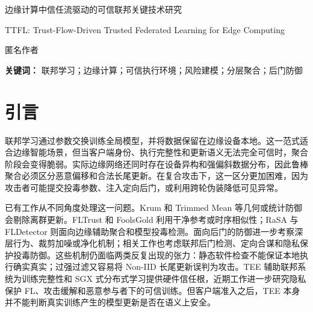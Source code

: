 \documentclass[10pt,a4paper,UTF8,fontset=fandol]{ctexart}
\begin{document}
\begin{center}
    {\Large 边缘计算中信任流驱动的可信联邦关键技术研究\par}
    \vspace{4pt}
    {\large TTFL: Trust-Flow-Driven Trusted Federated Learning for Edge Computing\par}
    \vspace{8pt}
    {匿名作者\par}
\end{center}

\begin{abstract}
    联邦学习（FL）通过避免原始数据迁移来支持边缘智能协同训练，但开放式边缘参与也使聚合过程暴露于不可信执行、模型投毒、隐蔽后门以及严重 Non-IID 偏移等风险之下。现有鲁棒聚合方法往往依赖更严格的阈值来拒绝恶意更新，却容易同时剔除合法的长尾客户端。本文提出一种信任流驱动的可信联邦学习框架，将硬件锚定准入、运行时信任证据、双流信誉演化和风险门控分层聚合联系起来。该方法通过历史性能流和瞬时风险流分离长期效用与短期攻击风险，再利用按层门控、裁剪和幸存者权重重归一化，在抑制投毒更新的同时保留有价值的异构贡献。基于 Flower/PyTorch 的 CIFAR-10 实验包含 20 个准入客户端、6 类混合攻击和 5 次重复运行；结果表明，在 30\% 恶意设置下，该方法达到 92.31\% 的准确率和 10.21\% 的 ASR，永久封禁误杀率接近零。
\end{abstract}

\noindent\textbf{关键词：} 联邦学习；边缘计算；可信执行环境；风险建模；分层聚合；后门防御

\section{引言}

联邦学习通过参数交换训练全局模型，并将数据保留在边缘设备本地\cite{kairouz2021flsurvey,mcmahan2017fedavg}。这一范式适合边缘智能场景，但当客户端身份、执行完整性和更新语义无法完全可信时，聚合阶段会变得脆弱。实际边缘网络还同时存在设备异构和强偏斜数据分布，因此鲁棒聚合必须区分恶意偏移和合法长尾更新。在复合攻击下，这一区分更加困难，因为攻击者可能提交投毒参数、注入定向后门，或利用跨轮伪装降低可见异常。

已有工作从不同角度处理这一问题。Krum 和 Trimmed Mean 等几何或统计防御会剔除离群更新\cite{blanchard2017krum,yin2018byzantine}。FLTrust 和 FoolsGold 利用干净参考或时序相似性\cite{cao2021fltrust,fung2020foolsgold}；RaSA 与 FLDetector 则面向边缘辅助聚合和模型投毒检测\cite{wang2025rasa,fldetector2022}。面向后门的防御进一步考察深层行为、裁剪加噪或净化机制\cite{deepsight2022,flame2022,flpurifier}；相关工作也考虑联邦后门检测、定向合谋和隐私保护投毒防御\cite{crowdguard2024,roseagg,shieldfl}。这些机制仍面临两类反复出现的张力：静态软件检查不能保证本地执行确实真实；过强过滤又容易将 Non-IID 长尾更新误判为攻击。TEE 辅助联邦系统为训练完整性和 SGX 式分布式学习提供硬件信任根\cite{r1_tee_integrity,xu2021distributed}，近期工作进一步研究隐私保护 FL、攻击缓解和恶意参与者下的可信训练\cite{zhang2025rppfl,r5_tee_mitigating,lu2025tmt}。但客户端准入之后，TEE 本身并不能判断真实训练产生的模型更新是否在语义上安全。
\end{document}

